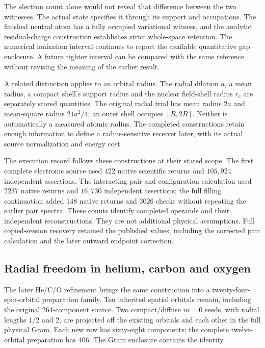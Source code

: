 The electron count alone would not reveal that difference between the two witnesses. The actual state specifies it through its support and occupations. The finished neutral atom has a fully occupied variational witness, and the analytic residual-charge construction establishes strict whole-space retention. The numerical ionization interval continues to report the available quantitative gap enclosure. A future tighter interval can be compared with the same reference without revising the meaning of the earlier result.

A related distinction applies to an orbital radius. The radial dilation $a$, a mean radius, a compact shell's support radius and the nuclear field-shell radius $r_c$ are separately stored quantities. The original radial trial has mean radius $2a$ and mean-square radius $21a^2/4$; an outer shell occupies $[R,2R]$. Neither is automatically a measured atomic radius. The completed constructions retain enough information to define a radius-sensitive receiver later, with its actual source normalization and energy cost.

The execution record follows these constructions at their stated scope. The first complete electronic source used $422$ native scientific returns and $105{,}924$ independent assertions. The interacting pair and configuration calculation used $2237$ native returns and $16{,}730$ independent assertions; the full filling continuation added $148$ native returns and $3026$ checks without repeating the earlier pair spectra. These counts identify completed operands and their independent reconstructions. They are not additional physical assumptions. Full copied-session recovery retained the published values, including the corrected pair calculation and the later outward endpoint correction.

\subsection{Radial freedom in helium, carbon and oxygen}

The later He/C/O refinement brings the same construction into a twenty-four-spin-orbital preparation family. Ten inherited spatial orbitals remain, including the original $264$-component source. Two compact/diffuse $m=0$ seeds, with radial lengths $1/2$ and $2$, are projected off the existing orbitals and each other in the full physical Gram. Each new row has sixty-eight components; the complete twelve-orbital preparation has $406$. The Gram enclosure contains the identity. 

